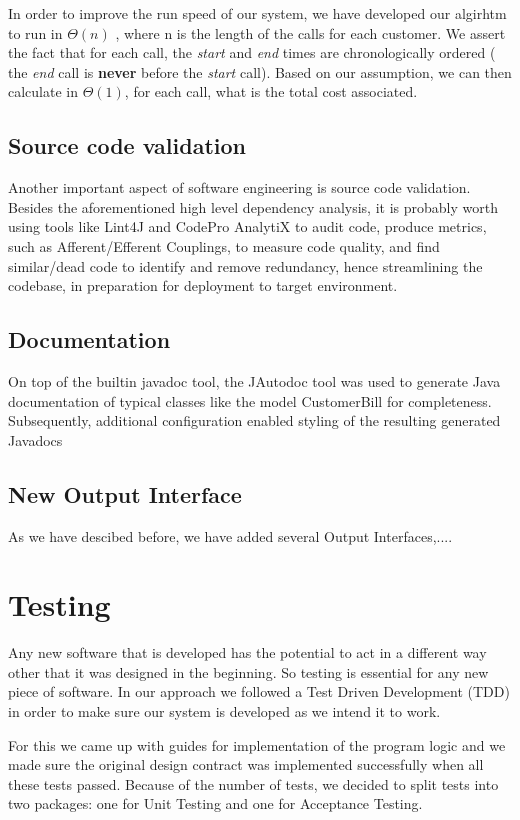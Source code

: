 \documentclass[11pt,twocolumn]{article} %
\begin{document}
In order to improve the run speed of our system, we have developed our algirhtm to run in $\Theta(n)$
, where n is the length of the calls for each customer. We assert the fact that for each call,
the \textit{start} and \textit{end} times are chronologically ordered ( the \textit{end} call is \textbf{never}
before the \textit{start} call). Based on our assumption, we can then calculate in $\Theta(1)$, for each call,
what is the total cost associated. 

\subsection{Source code validation}
Another important aspect of software engineering is source code validation. Besides the
aforementioned high level dependency analysis, it is probably worth using tools like Lint4J
and CodePro AnalytiX to audit code, produce metrics, such as Afferent/Efferent Couplings, to measure code quality, and find similar/dead code to identify and remove redundancy, hence streamlining the codebase, in preparation for deployment to target environment.


\subsection{Documentation}
On top of the builtin javadoc tool, the JAutodoc tool was used to generate Java documentation of typical classes like the model CustomerBill for completeness.
Subsequently, additional configuration enabled styling of the resulting generated Javadocs

\subsection{New Output Interface}
As we have descibed before, we have added several Output Interfaces,....

\section{Testing}
Any new software that is developed has the potential to act in a different way other that it was designed in the beginning. So testing is essential for any new piece of software.
In our approach we followed a Test Driven Development (TDD) in order to make sure our system is developed as we intend it to work. 

For this we came up with guides for implementation of the program logic and we made sure the original design contract was implemented successfully when all these tests passed.            
Because of the number of tests, we decided to split tests into two packages: one for Unit Testing and one for Acceptance Testing.
\end{document}
